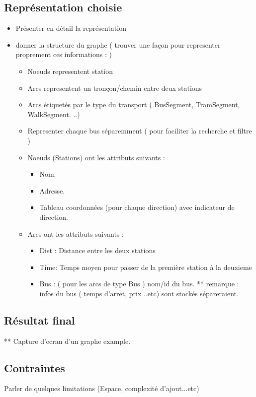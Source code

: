 \subsection{Représentation choisie}
	\begin{itemize}
	\item Présenter en détail la représentation
	\item donner la structure du graphe ( trouver une façon pour representer proprement ces informations : )
	\begin{itemize}
		 \item Noeuds representent station
		 \item Arcs representent un tronçon/chemin entre deux stations
		 \item Arcs étiquetés par le type du transport ( BusSegment, TramSegment, WalkSegment. ..) 
		 \item Representer chaque bus séparemment ( pour faciliter la recherche et filtre ) 
		 \item Noeuds (Stations) ont les attributs suivants : 
		 \begin{itemize}
		 	\item Nom.
		 	\item Adresse.
		 	\item Tableau coordonnées (pour chaque direction) avec indicateur de direction.
		 \end{itemize}
		 \item Arcs ont les attributs suivants :
		 \begin{itemize}
		 		\item Dist : Distance entre les deux stations
		 		\item Time: Temps moyen pour passer de la première station à la deuxieme
		 		\item Bus : ( pour les arcs de type Bus ) nom/id du bus.
		 		** remarque : infos du bus ( temps d'arret, prix ..etc) sont stockés sépareraient.
		 \end{itemize}
	\end{itemize}
	\end{itemize}

\subsection{Résultat final}
	** Capture d'ecran d'un graphe example.
\subsection{Contraintes}
Parler de quelques limitations (Espace, complexité d'ajout...etc)

				